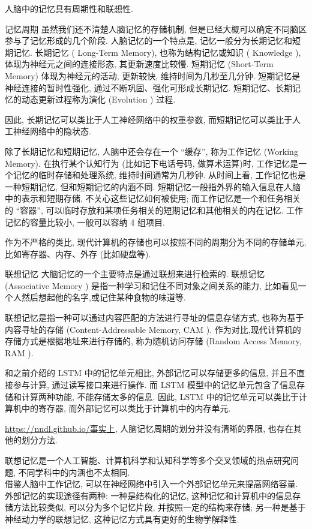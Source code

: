 \documentclass[10pt]{article}
\begin{document}
人脑中的记忆具有周期性和联想性.

记忆周期 虽然我们还不清楚人脑记忆的存储机制, 但是已经大概可以确定不同脑区参与了记忆形成的几个阶段. 人脑记忆的一个特点是, 记忆一般分为长期记忆和短期记忆. 长期记忆 ( Long-Term Memory), 也称为结构记忆或知识 ( Knowledge ), 体现为神经元之间的连接形态, 其更新速度比较慢. 短期记忆 (Short-Term Memory) 体现为神经元的活动, 更新较快, 维持时间为几秒至几分钟. 短期记忆是神经连接的暂时性强化, 通过不断巩固、强化可形成长期记忆. 短期记忆、长期记忆的动态更新过程称为演化 (Evolution ) 过程.

因此, 长期记忆可以类比于人工神经网络中的权重参数, 而短期记忆可以类比于人工神经网络中的隐状态.

除了长期记忆和短期记忆, 人脑中还会存在一个 “缓存”, 称为工作记忆 (Working Memory). 在执行某个认知行为 (比如记下电话号码, 做算术运算)时, 工作记忆是一个记忆的临时存储和处理系统, 维持时间通常为几秒钟. 从时间上看, 工作记忆也是一种短期记忆, 但和短期记忆的内涵不同. 短期记忆一般指外界的输入信息在人脑中的表示和短期存储, 不关心这些记忆如何被使用; 而工作记忆是一个和任务相关的 “容器”, 可以临时存放和某项任务相关的短期记忆和其他相关的内在记忆. 工作记忆的容量比较小, 一般可以容纳 4 组项目.

作为不严格的类比, 现代计算机的存储也可以按照不同的周期分为不同的存储单元, 比如寄存器、内存、外存 (比如硬盘等).

联想记忆 大脑记忆的一个主要特点是通过联想来进行检索的. 联想记忆 (Associative Memory ) 是指一种学习和记住不同对象之间关系的能力, 比如看见一个人然后想起他的名字,或记住某种食物的味道等.

联想记忆是指一种可以通过内容匹配的方法进行寻址的信息存储方式, 也称为基于内容寻址的存储 (Content-Addressable Memory, CAM ). 作为对比,现代计算机的存储方式是根据地址来进行存储的, 称为随机访问存储 (Random Access Memory, RAM ).

和之前介绍的 LSTM 中的记忆单元相比, 外部记忆可以存储更多的信息, 并且不直接参与计算, 通过读写接口来进行操作. 而 LSTM 模型中的记忆单元包含了信息存储和计算两种功能, 不能存储太多的信息. 因此, LSTM 中的记忆单元可以类比于计算机中的寄存器, 而外部记忆可以类比于计算机中的内存单元.

\href{https://nndl.github.io/%E4%BA%8B%E5%AE%9E%E4%B8%8A}{https://nndl.github.io/事实上}, 人脑记忆周期的划分并没有清晰的界限, 也存在其他的划分方法.

联想记忆是一个人工智能、计算机科学和认知科学等多个交叉领域的热点研究问题, 不同学科中的内涵也不太相同.\\
借鉴人脑中工作记忆, 可以在神经网络中引入一个外部记忆单元来提高网络容量. 外部记忆的实现途径有两种: 一种是结构化的记忆, 这种记忆和计算机中的信息存储方法比较类似, 可以分为多个记忆片段, 并按照一定的结构来存储; 另一种是基于神经动力学的联想记忆, 这种记忆方式具有更好的生物学解释性.
\end{document}
